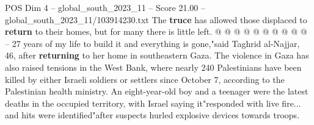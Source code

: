 \begin{textsample}{POS Dim 4 – global\_south\_2023\_11 – Score 21.00 – global\_south\_2023\_11/103914230.txt}
The \textbf{truce} has allowed those displaced to \textbf{return} to their homes, but for many there is little left. @ @ @ @ @ @ @ @ @ @ -- 27 years of my life to build it and everything is gone,"said Taghrid al-Najjar, 46, after \textbf{returning} to her home in southeastern Gaza.
The violence in Gaza has also raised tensions in the West Bank, where nearly 240 Palestinians have been killed by either Israeli soldiers or settlers since October 7, according to the Palestinian health ministry.
An eight-year-old boy and a teenager were the latest deaths in the occupied territory, with Israel saying it"responded with live fire... and hits were identified"after suspects hurled explosive devices towards troops.

\end{textsample}
